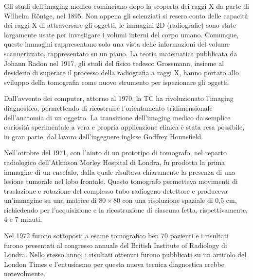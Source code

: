 \documentclass[12pt,a4paper]{report}
\begin{document}
Gli studi dell'imaging medico cominciano dopo la scoperta dei raggi X da parte di Wilhelm Röntge, nel 1895.
Non appena gli scienziati si resero conto delle capacità dei raggi X di attraversare gli oggetti, le immagini 2D (radiografie)
sono state largamente usate per investigare i volumi interni del corpo umano.
Comunque, queste immagini rappresentano solo una vista delle informazioni del volume scannerizzato, rappresentato su un piano.
La teoria matematica pubblicata da Johann Radon nel 1917, gli studi del fisico tedesco Grossmann, insieme al desiderio di superare
il processo della radiografia a raggi X, hanno portato allo sviluppo della tomografia come nuovo strumento per ispezionare gli
oggetti.

Dall'avvento dei computer, attorno al 1970, la TC ha rivoluzionato l'imaging diagnostico, permettendo di ricostruire
l'orientamento tridimensionale dell'anatomia di un oggetto.
La transizione dell'imaging medico da semplice curiosità sperimentale a vera e propria applicazione clinica è stata resa
possibile, in gran parte, dal lavoro dell'ingegnere inglese Godfrey Hounsfield.

Nell'ottobre del 1971, con l'aiuto di un prototipo di tomografo, nel reparto radiologico dell'Atkinson Morley Hospital di Londra,
fu prodotta la prima immagine di un encefalo, dalla quale risultava chiaramente la presenza di una lesione tumorale nel lobo
frontale.
Questo tomografo permetteva movimenti di traslazione e rotazione del complesso tubo radiogeno-detettore e produceva un'immagine su
una matrice di \(80 \times 80\) con una risoluzione spaziale di 0,5 cm, richiedendo per l'acquisizione e la ricostruzione di
ciascuna fetta, rispettivamente, 4 e 7 minuti.

Nel 1972 furono sottoposti a esame tomografico ben 70 pazienti e i risultati furono presentati al congresso annuale del British
Institute of Radiology di Londra.
Nello stesso anno, i risultati ottenuti furono pubblicati su un articolo del London Times e l'entusiasmo per questa nuova tecnica
diagnostica crebbe notevolmente.
\end{document}
